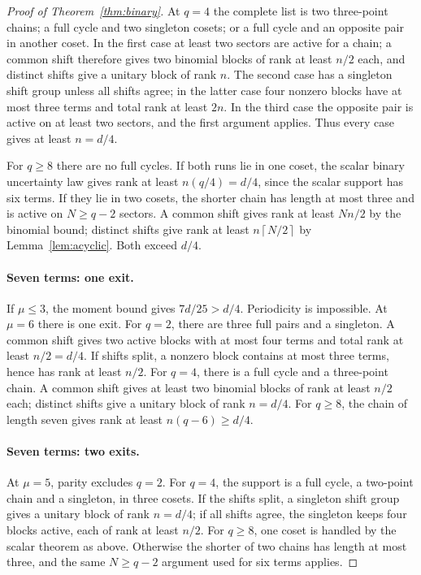 \documentclass[11pt,a4paper]{article}
\theoremstyle{remark}\newtheorem{remark}[theorem]{Remark}
\newcommand{\ceil}[1]{\left\lceil #1\right\rceil}
\begin{document}
\begin{proof}[Proof of Theorem~\ref{thm:binary}]
At $q=4$ the complete list is two three-point chains; a full cycle and two singleton cosets; or a full cycle and an opposite pair in another coset. In the first case at least two sectors are active for a chain; a common shift therefore gives two binomial blocks of rank at least $n/2$ each, and distinct shifts give a unitary block of rank $n$. The second case has a singleton shift group unless all shifts agree; in the latter case four nonzero blocks have at most three terms and total rank at least $2n$. In the third case the opposite pair is active on at least two sectors, and the first argument applies. Thus every case gives at least $n=d/4$.

For $q\ge8$ there are no full cycles. If both runs lie in one coset, the scalar binary uncertainty law \cite[Theorem 10, equation (23), TW470]{dvb} gives rank at least $n(q/4)=d/4$, since the scalar support has six terms. If they lie in two cosets, the shorter chain has length at most three and is active on $N\ge q-2$ sectors. A common shift gives rank at least $Nn/2$ by the binomial bound; distinct shifts give rank at least $n\ceil{N/2}$ by Lemma~\ref{lem:acyclic}. Both exceed $d/4$.

\paragraph{Seven terms: one exit.}
If $\mu\le3$, the moment bound gives $7d/25>d/4$. Periodicity is impossible. At $\mu=6$ there is one exit.
For $q=2$, there are three full pairs and a singleton. A common shift gives two active blocks with at most four terms and total rank at least $n/2=d/4$. If shifts split, a nonzero block contains at most three terms, hence has rank at least $n/2$.
For $q=4$, there is a full cycle and a three-point chain. A common shift gives at least two binomial blocks of rank at least $n/2$ each; distinct shifts give a unitary block of rank $n=d/4$.
For $q\ge8$, the chain of length seven gives rank at least $n(q-6)\ge d/4$.

\paragraph{Seven terms: two exits.}
At $\mu=5$, parity excludes $q=2$. For $q=4$, the support is a full cycle, a two-point chain and a singleton, in three cosets. If the shifts split, a singleton shift group gives a unitary block of rank $n=d/4$; if all shifts agree, the singleton keeps four blocks active, each of rank at least $n/2$.
For $q\ge8$, one coset is handled by the scalar theorem as above. Otherwise the shorter of two chains has length at most three, and the same $N\ge q-2$ argument used for six terms applies.


\end{proof}
\end{document}
